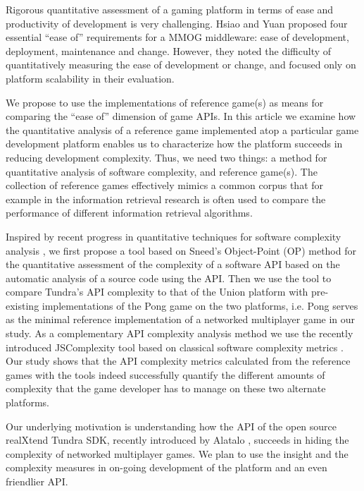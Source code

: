 \documentclass[conference]{IEEEtran}
\begin{document}
Rigorous quantitative assessment of a gaming platform in terms of ease
and productivity of development is very challenging. Hsiao and Yuan
\cite{middleware} proposed four essential ``ease of'' requirements for
a MMOG middleware: ease of development, deployment, maintenance and
change. However, they noted the difficulty of quantitatively measuring
the ease of development or change, and focused only on platform
scalability in their evaluation.

We propose to use the implementations of reference game(s) as means
for comparing the “ease of” dimension of game APIs. In this article we
examine how the quantitative analysis of a reference game implemented
atop a particular game development platform enables us to characterize
how the platform succeeds in reducing development complexity. Thus, we
need two things: a method for quantitative analysis of software
complexity, and reference game(s). The collection of reference games
effectively mimics a common corpus that for example in the information
retrieval research is often used to compare the performance of
different information retrieval algorithms.

Inspired by recent progress in quantitative techniques for software
complexity analysis \cite{cmu-api_failures,api-complexity-analysis},
we first propose a tool based on Sneed’s Object-Point (OP) method for
the quantitative assessment of the complexity of a software API based
on the automatic analysis of a source code using the API. Then we use
the tool to compare Tundra’s API complexity to that of the Union
platform with pre-existing implementations of the Pong game on the two
platforms, i.e. Pong serves as the minimal reference implementation of
a networked multiplayer game in our study. As a complementary API
complexity analysis method we use the recently introduced JSComplexity
tool based on classical software complexity metrics
\cite{jscomplexity}. Our study shows that the API complexity metrics
calculated from the reference games with the tools indeed successfully
quantify the different amounts of complexity that the game developer
has to manage on these two alternate platforms.

Our underlying motivation is understanding how the API of the open
source realXtend Tundra SDK, recently introduced by Alatalo
\cite{Alatalo2011}, succeeds in hiding the complexity of networked
multiplayer games. We plan to use the insight and the complexity
measures in on-going development of the platform and an even
friendlier API.
\end{document}
